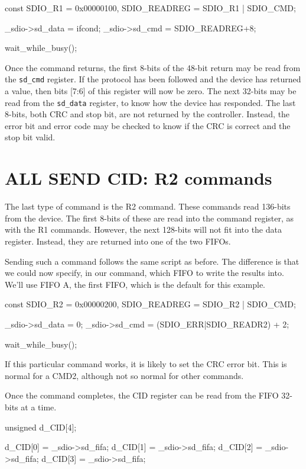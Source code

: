 \documentclass{gqtekspec}
\begin{document}
\begin{zCpp}
	const	SDIO_R1      = 0x00000100,
		SDIO_READREG = SDIO_R1 | SDIO_CMD;

	_sdio->sd_data = ifcond;
	_sdio->sd_cmd = SDIO_READREG+8;

	wait_while_busy();
\end{zCpp}

Once the command returns, the first 8-bits of the 48-bit return may be
read from the {\tt sd\_cmd} register.  If the protocol has been followed and
the device has returned a value, then bits [7:6] of this register will now
be zero.  The next 32-bits may be read from the {\tt sd\_data} register, to
know how the device has responded.  The last 8-bits, both CRC and stop bit,
are not returned by the controller.  Instead, the error bit and error code may
be checked to know if the CRC is correct and the stop bit valid.

\section{ALL SEND CID: R2 commands}
The last type of command is the R2 command.  These commands read 136-bits
from the device.  The first 8-bits of these are read into the command register,
as with the R1 commands.  However, the next 128-bits will not fit into the
data register.  Instead, they are returned into one of the two FIFOs.

Sending such a command follows the same script as before.  The difference is
that we could now specify, in our command, which FIFO to write the results into.
We'll use FIFO A, the first FIFO, which is the default for this example.

\begin{zCpp}
	const	SDIO_R2      = 0x00000200,
		SDIO_READREG = SDIO_R2 | SDIO_CMD;

	_sdio->sd_data = 0;
	_sdio->sd_cmd = (SDIO_ERR|SDIO_READR2) + 2;

	wait_while_busy();
\end{zCpp}

If this particular command works, it is likely to set the CRC error bit.
This is normal for a CMD2, although not so normal for other commands.

Once the command completes, the CID register can be read from the FIFO
32-bits at a time.

\begin{zCpp}
	unsigned	d_CID[4];

	d_CID[0] = _sdio->sd_fifa;
	d_CID[1] = _sdio->sd_fifa;
	d_CID[2] = _sdio->sd_fifa;
	d_CID[3] = _sdio->sd_fifa;
\end{zCpp}
\end{document}
